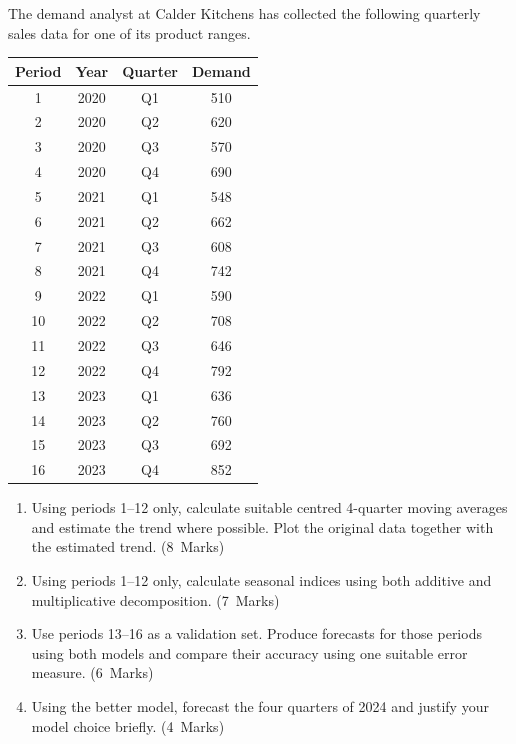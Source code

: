 \documentclass[11pt,a4paper]{article}
\newcommand{\markalloc}[1]{\nobreak\hfill\mbox{(#1 Marks)}}
\begin{document}
The demand analyst at Calder Kitchens has collected the following quarterly sales data for one of its product ranges.

\begin{center}
\begin{tabular}{cccc}
\toprule
Period & Year & Quarter & Demand \\
\midrule
1  & 2020 & Q1 & 510 \\
2  & 2020 & Q2 & 620 \\
3  & 2020 & Q3 & 570 \\
4  & 2020 & Q4 & 690 \\
5  & 2021 & Q1 & 548 \\
6  & 2021 & Q2 & 662 \\
7  & 2021 & Q3 & 608 \\
8  & 2021 & Q4 & 742 \\
9  & 2022 & Q1 & 590 \\
10 & 2022 & Q2 & 708 \\
11 & 2022 & Q3 & 646 \\
12 & 2022 & Q4 & 792 \\
13 & 2023 & Q1 & 636 \\
14 & 2023 & Q2 & 760 \\
15 & 2023 & Q3 & 692 \\
16 & 2023 & Q4 & 852 \\
\bottomrule
\end{tabular}
\end{center}

\begin{enumerate}
\item Using periods 1--12 only, calculate suitable centred 4-quarter moving averages and estimate the trend where possible. Plot the original data together with the estimated trend. \markalloc{8}

\item Using periods 1--12 only, calculate seasonal indices using both additive and multiplicative decomposition. \markalloc{7}

\item Use periods 13--16 as a validation set. Produce forecasts for those periods using both models and compare their accuracy using one suitable error measure. \markalloc{6}

\item Using the better model, forecast the four quarters of 2024 and justify your model choice briefly. \markalloc{4}
\end{enumerate}
\end{document}
